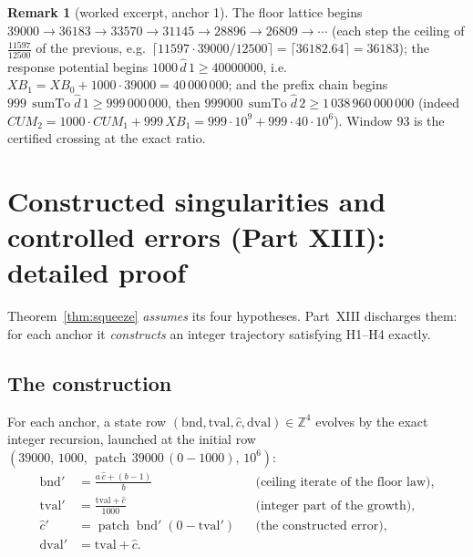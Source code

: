 \documentclass[11pt]{article}
\newcommand{\dhat}{\widehat{d}}
\newcommand{\chat}{\widehat{c}}
\newcommand{\sumto}{\operatorname{sumTo}}
\newcommand{\patch}{\operatorname{patch}}
\theoremstyle{plain}
\theoremstyle{definition}
\newtheorem{remark}[lemma]{Remark}
\begin{document}
\begin{remark}[worked excerpt, anchor 1]
The floor lattice begins $39000\to 36183\to 33570\to 31145\to 28896\to 26809\to\cdots$
(each step the ceiling of $\tfrac{11597}{12500}$ of the previous, e.g.\
$\lceil 11597\cdot 39000/12500\rceil=\lceil 36182.64\rceil=36183$); the response potential
begins $1000\,\dhat\,1\ge 40000000$, i.e.\ $XB_1=XB_0+1000\cdot 39000=40\,000\,000$; and
the prefix chain begins $999\,\sumto\dhat\,1\ge 999\,000\,000$, then
$999000\,\sumto\dhat\,2\ge 1\,038\,960\,000\,000$ (indeed
$CUM_2=1000\cdot CUM_1+999\,XB_1=999\cdot 10^{9}+999\cdot 40\cdot 10^{6}$). Window $93$
is the certified crossing at the exact ratio.
\end{remark}

\section{Constructed singularities and controlled errors (Part XIII): detailed proof}\label{sec:witness}

Theorem~\ref{thm:squeeze} \emph{assumes} its four hypotheses. Part~XIII discharges them:
for each anchor it \emph{constructs} an integer trajectory satisfying H1--H4 exactly.

\subsection{The construction}
For each anchor, a state row $(\mathrm{bnd},\mathrm{tval},\chat,\mathrm{dval})\in\mathbb{Z}^4$
evolves by the exact integer recursion, launched at the initial row
$(39000,\,1000,\,\patch\,39000\,(0-1000),\,10^{6})$:
\begin{align}
\mathrm{bnd}'&=\frac{a\,\chat+(b-1)}{b} &&\text{(ceiling iterate of the floor law)},\label{eq:bnd}\\
\mathrm{tval}'&=\frac{\mathrm{tval}+\chat}{1000} &&\text{(integer part of the growth)},\label{eq:tval}\\
\chat'&=\patch\;\mathrm{bnd}'\;(0-\mathrm{tval}') &&\text{(the constructed error)},\label{eq:chat}\\
\mathrm{dval}'&=\mathrm{tval}+\chat .\label{eq:dval}
\end{align}
\end{document}
